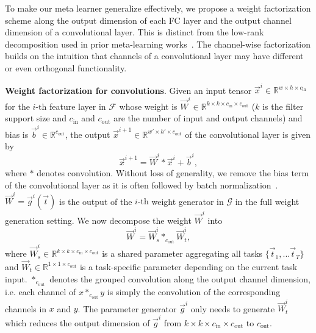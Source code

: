 \documentclass[10pt,twocolumn,letterpaper]{article}
\newcommand\minisection[1]{\vspace{2mm}\noindent \textbf{#1}}
\begin{document}
To make our meta learner generalize effectively, we propose a weight 
factorization scheme along the output dimension of each FC layer and 
the output channel dimension of a convolutional layer.
This is distinct from the low-rank decomposition used in prior meta-learning works~\cite{bertinetto2016learning}. 
The channel-wise factorization builds on the intuition 
that channels of a convolutional layer
may have different or even orthogonal functionality. 


\minisection{Weight factorization for convolutions}. 
Given an input tensor $\Vec{x}^i\in \mathbb{R}^{w\times h\times c_\text{in}}$ for
the $i\text{-th}$ feature layer in $\mathcal{F}$ whose weight is $\Vec{W}^i \in\mathbb{R}^{k\times k\times c_\text{in}\times c_\text{out}}$ 
($k$ is the filter support size and $c_\text{in}$ and $c_\text{out}$ are 
the number of input and output channels) and bias is  $\Vec{b}^i\in\mathbb{R}^{c_\text{out}}$, the output $\Vec{x}^{i+1}\in \mathbb{R}^{w'\times h'\times c_\text{out}}$ of the convolutional layer is given
by 
\begin{equation}
\Vec{x}^{i+1} = \Vec{W}^i * \Vec{x}^{i} + \Vec{b}^{i},
\end{equation}
where $*$ denotes convolution. Without loss of generality, we remove the bias term of the convolutional layer as it is often followed by batch normalization~\cite{ioffe2015batch}. $\Vec{W}^i = \Vec{g}^i(\Vec{t})$ is
the output of the $i\text{-th}$ weight generator in $\mathcal{G}$ in the full weight generation setting.  
We now decompose the weight $\Vec{W}^i$ into 
\begin{equation}
\Vec{W}^i=\Vec{W}^i_s *_{c_{\text{out}}} \Vec{W}^i_t,
\end{equation}
where $\Vec{W}^i_s\in\mathbb{R}^{k\times k \times c_\text{in}\times c_\text{out}}$ is a shared parameter aggregating all tasks $\{\Vec{t}_1, ...\Vec{t}_T\}$ and $\Vec{W}_t\in\mathbb{R}^{1\times1\times c_\text{out}}$
is a task-specific parameter depending on the current task input. $*_{c_\text{out}}$ denotes the grouped convolution along the output channel dimension,
i.e. each channel of $x*_{c_\text{out}} y$ is simply the convolution of the corresponding channels in $x$ and $y$. 
The parameter generator $\Vec{g}^i$ only needs to generate 
$\Vec{W}^i_t$ which reduces the output dimension of $\Vec{g}^i$ from $k\times k \times c_\text{in}\times c_\text{out}$ to $c_\text{out}$.
\end{document}
